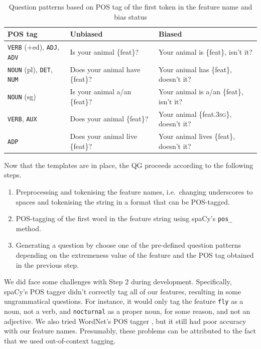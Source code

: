 \documentclass[11pt,a4paper]{article}
\begin{document}
\begin{table}[ht]
\centering
	\begin{tabularx}{\linewidth}{lLL}
		\toprule
		POS tag & Unbiased & Biased \\
		\midrule
		\texttt{VERB} (+ed), \texttt{ADJ}, \texttt{ADV} & Is your animal \{feat\}? & Your animal is \{feat\}, isn't it? \\
		\texttt{NOUN} (pl), \texttt{DET}, \texttt{NUM} & Does your animal have \{feat\}? & Your animal has \{feat\}, doesn't it? \\
		\texttt{NOUN} (sg) & Is your animal a/an \{feat\}? & Your animal is a/an \{feat\}, isn't it? \\
		\texttt{VERB}, \texttt{AUX} & Does your animal \{feat\}? & Your animal \{feat.\textsc{3sg}\}, doesn't it? \\
		\texttt{ADP} & Does your animal live \{feat\}? & Your animal lives \{feat\}, doesn't it? \\ 
		\bottomrule
	\end{tabularx}
\caption{Question patterns based on POS tag of the first token in the feature name and bias status}
\label{tab:question_patterns}
\end{table}

Now that the templates are in place, the QG proceeds according to the following steps.

\begin{enumerate}
  \item Preprocessing and tokenising the feature names, i.e.\ changing underscores to spaces and tokenising the string in a format that can be POS-tagged.
  \item POS-tagging of the first word in the feature string using spaCy's \texttt{pos\_} method.
  \item Generating a question by choose one of the pre-defined question patterns depending on the extremeness value of the feature and the POS tag obtained in the previous step.
\end{enumerate}

We did face some challenges with Step 2 during development.
Specifically, spaCy's POS tagger didn't correctly tag all of our features, resulting in some ungrammatical questions.
For instance, it would only tag the feature \texttt{fly} as a noun, not a verb, and \texttt{nocturnal} as a proper noun, for some reason, and not an adjective.
We also tried WordNet's POS tagger \citep{Fellbaum2010}, but it still had poor accuracy with our feature names. 
Presumably, these problems can be attributed to the fact that we used out-of-context tagging.
\end{document}
